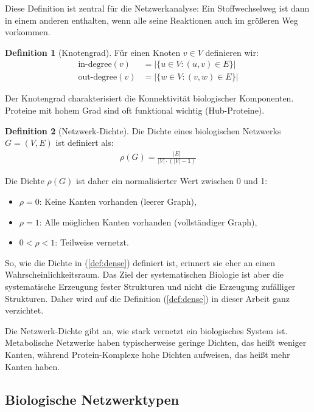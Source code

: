 ﻿\documentclass[a4paper,12pt]{article}
\theoremstyle{definition}
\newtheorem{definition}{Definition}
\begin{document}
Diese Definition ist zentral für die Netzwerkanalyse: Ein Stoffwechselweg ist dann in einem anderen enthalten, wenn alle seine Reaktionen auch im größeren Weg vorkommen.

\begin{definition}[Knotengrad]
	Für einen Knoten $v \in V$ definieren wir:
	\begin{align*}
		\text{in-degree}(v) &= |\{u \in V : (u,v) \in E\}| \\
		\text{out-degree}(v) &= |\{w \in V : (v,w) \in E\}|
	\end{align*}
\end{definition}

Der Knotengrad charakterisiert die Konnektivität biologischer Komponenten. Proteine mit hohem Grad sind oft funktional wichtig (Hub-Proteine).

\begin{definition}[Netzwerk-Dichte]
	Die Dichte eines biologischen Netzwerks $G = (V,E)$ ist definiert als:
	\begin{align}
		\label{def:dense}
		\rho(G) = \frac{|E|}{|V| \cdot (|V|-1)}
	\end{align}
\end{definition}
Die Dichte $\rho(G)$ ist daher ein normalisierter Wert zwischen 0 und 1:
\begin{itemize}
	\item[-] $\rho = 0$: Keine Kanten vorhanden (leerer Graph),
	\item[-] $\rho = 1$: Alle möglichen Kanten vorhanden (vollständiger Graph),
	\item[-] $0 < \rho < 1$: Teilweise vernetzt.
\end{itemize}
So, wie die Dichte in (\ref{def:dense}) definiert ist, erinnert sie eher an einen Wahrscheinlichkeitsraum. Das Ziel der systematischen Biologie ist aber die systematische Erzeugung fester Strukturen und nicht die Erzeugung zufälliger Strukturen. Daher wird auf die Definition (\ref{def:dense}) in dieser Arbeit ganz verzichtet. 

Die Netzwerk-Dichte gibt an, wie stark vernetzt ein biologisches System ist. Metabolische Netzwerke haben typischerweise geringe Dichten, das heißt weniger Kanten, während Protein-Komplexe hohe Dichten aufweisen, das heißt mehr Kanten haben.

\subsection{Biologische Netzwerktypen}
\end{document}
